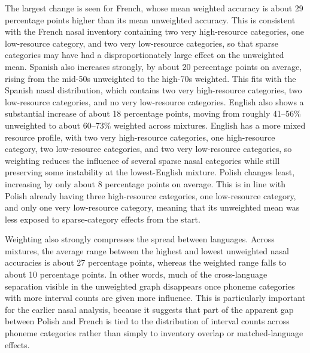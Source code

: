 \iffalse
The largest change is seen for French, whose mean weighted accuracy is about 29 percentage points higher than its mean unweighted accuracy. This is consistent with the French nasal inventory containing two very high-resource categories, one low-resource category, and two very low-resource categories, so that sparse categories may have had a disproportionately large effect on the unweighted mean. Spanish also increases strongly, by about 20 percentage points on average, rising from the mid-50s unweighted to the high-70s weighted. This fits with the Spanish nasal distribution, which contains two very high-resource categories, two low-resource categories, and no very low-resource categories. English also shows a substantial increase of about 18 percentage points, moving from roughly 41–56\% unweighted to about 60–73\% weighted across mixtures. English has a more mixed resource profile, with two very high-resource categories, one high-resource category, two low-resource categories, and two very low-resource categories, so weighting reduces the influence of several sparse nasal categories while still preserving some instability at the lowest-English mixture. Polish changes least, increasing by only about 8 percentage points on average. This is in line with Polish already having three high-resource categories, one low-resource category, and only one very low-resource category, meaning that its unweighted mean was less exposed to sparse-category effects from the start.

Weighting also strongly compresses the spread between languages. Across mixtures, the average range between the highest and lowest unweighted nasal accuracies is about 27 percentage points, whereas the weighted range falls to about 10 percentage points. In other words, much of the cross-language separation visible in the unweighted graph disappears once phoneme categories with more interval counts are given more influence. This is particularly important for the earlier nasal analysis, because it suggests that part of the apparent gap between Polish and French is tied to the distribution of interval counts across phoneme categories rather than simply to inventory overlap or matched-language effects.

